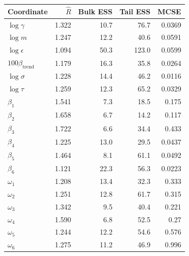 \begin{tabular}{lrrrr}
\toprule
Coordinate & $\widehat R$ & Bulk ESS & Tail ESS & MCSE \\
\midrule
$\log\gamma$ & 1.322 & 10.7 & 76.7 & 0.0369 \\
$\log m$ & 1.247 & 12.2 & 40.6 & 0.0591 \\
$\log\epsilon$ & 1.094 & 50.3 & 123.0 & 0.0599 \\
$100\beta_{\mathrm{trend}}$ & 1.179 & 16.3 & 35.8 & 0.0264 \\
$\log\sigma$ & 1.228 & 14.4 & 46.2 & 0.0116 \\
$\log\tau$ & 1.259 & 12.3 & 65.2 & 0.0329 \\
$\beta_1$ & 1.541 & 7.3 & 18.5 & 0.175 \\
$\beta_2$ & 1.658 & 6.7 & 14.2 & 0.117 \\
$\beta_3$ & 1.722 & 6.6 & 34.4 & 0.433 \\
$\beta_4$ & 1.225 & 13.0 & 29.5 & 0.0437 \\
$\beta_5$ & 1.464 & 8.1 & 61.1 & 0.0492 \\
$\beta_6$ & 1.121 & 22.3 & 56.3 & 0.0223 \\
$\omega_1$ & 1.208 & 13.4 & 32.3 & 0.333 \\
$\omega_2$ & 1.251 & 12.8 & 61.7 & 0.315 \\
$\omega_3$ & 1.342 & 9.5 & 40.4 & 0.221 \\
$\omega_4$ & 1.590 & 6.8 & 52.5 & 0.27 \\
$\omega_5$ & 1.244 & 12.2 & 54.6 & 0.576 \\
$\omega_6$ & 1.275 & 11.2 & 46.9 & 0.996 \\
\bottomrule
\end{tabular}
